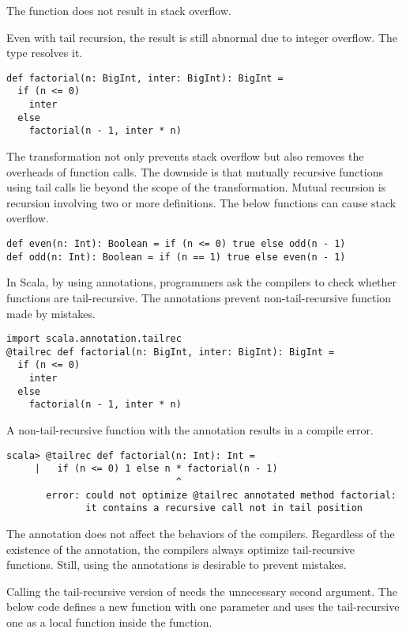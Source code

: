 The function does not result in stack overflow.

Even with tail recursion,
the result is still abnormal due to integer overflow. The  type
resolves it.

\begin{verbatim}
def factorial(n: BigInt, inter: BigInt): BigInt =
  if (n <= 0)
    inter
  else
    factorial(n - 1, inter * n)
\end{verbatim}

The transformation not only prevents stack overflow but also removes the
overheads of function calls. The downside is that mutually recursive
functions using tail calls lie beyond the scope of the transformation.
Mutual recursion is recursion involving two or more definitions.
The below functions can cause stack overflow.

\begin{verbatim}
def even(n: Int): Boolean = if (n <= 0) true else odd(n - 1)
def odd(n: Int): Boolean = if (n == 1) true else even(n - 1)
\end{verbatim}

In Scala, by using annotations, programmers ask the compilers to check
whether functions are tail-recursive. The annotations prevent non-tail-recursive
function made by mistakes.

\begin{verbatim}
import scala.annotation.tailrec
@tailrec def factorial(n: BigInt, inter: BigInt): BigInt =
  if (n <= 0)
    inter
  else
    factorial(n - 1, inter * n)
\end{verbatim}

A non-tail-recursive function with the  annotation results in a
compile error.

\begin{verbatim}
scala> @tailrec def factorial(n: Int): Int =
     |   if (n <= 0) 1 else n * factorial(n - 1)
                              ^
       error: could not optimize @tailrec annotated method factorial:
              it contains a recursive call not in tail position
\end{verbatim}

The annotation does not affect the behaviors of the compilers.
Regardless of the existence of the annotation, the compilers always optimize
tail-recursive functions. Still, using the annotations is desirable to prevent
mistakes.

Calling the tail-recursive version of  needs the unnecessary
second argument. The below code defines a new  function with one
parameter and uses the tail-recursive one as a local function inside the
function.

